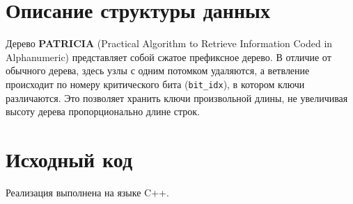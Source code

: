 \documentclass[unicode, 12pt, a4paper,oneside,fleqn]{article}
\begin{document}
\pagebreak

\section{Описание структуры данных}
Дерево \textbf{PATRICIA} (Practical Algorithm to Retrieve Information Coded in Alphanumeric) представляет собой сжатое префиксное дерево. В отличие от обычного дерева, здесь узлы с одним потомком удаляются, а ветвление происходит по номеру критического бита (\texttt{bit\_idx}), в котором ключи различаются. Это позволяет хранить ключи произвольной длины, не увеличивая высоту дерева пропорционально длине строк.

\section{Исходный код}
Реализация выполнена на языке C++.
\end{document}
